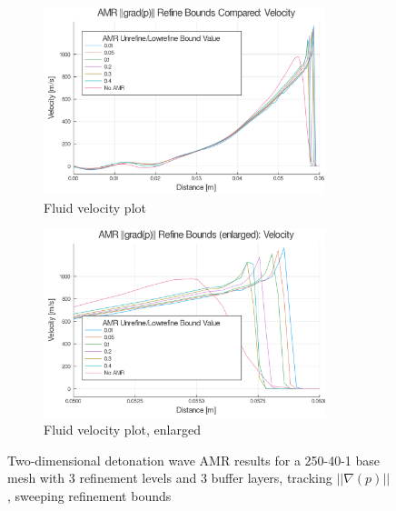 \begin{figure} \ContinuedFloat
    
    \centering
    \begin{subfigure}[]{\textwidth}
        \centering
        \includegraphics[width=0.9\textwidth]{./figs/amrfigs/amr_refinebounds/u.png}
        \caption{Fluid velocity plot}
    \end{subfigure}

    \centering
    \begin{subfigure}[]{\textwidth}
        \centering
        \includegraphics[width=0.9\textwidth]{./figs/amrfigs/amr_refinebounds/ue.png}
        \caption{Fluid velocity plot, enlarged}
    \end{subfigure}

    \caption{Two-dimensional detonation wave AMR results for a 250-40-1 base mesh with 3 refinement levels and 3 buffer layers, tracking \( ||\nabla(p)||\), sweeping refinement bounds }
    \label{fig:amr_refinebounds}
\end{figure}%
